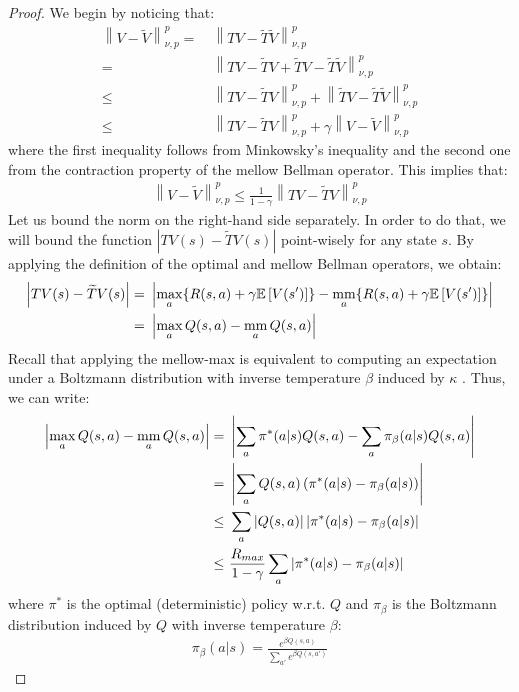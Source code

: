 \documentclass{article}
\newcommand{\mm}{\operatornamewithlimits{mm}}
\newcommand{\wt}[1]{\widetilde{#1}}
\newcommand{\norm}[1]{\left\lVert #1 \right\rVert}
\newcommand{\abs}[1]{\left\lvert #1 \right\rvert}
\begin{document}
\thmmv*
\begin{proof}
We begin by noticing that:
\begin{align*}
\norm{V-\wt{V}}_{\nu,p}^p =\ & \norm{TV - \wt{T}\wt{V}}_{\nu,p}^p \\ =\ &
\norm{TV - \wt{T}V + \wt{T}V - \wt{T}\wt{V}}_{\nu,p}^p \\ \leq\ &
\norm{TV - \wt{T}V}_{\nu,p}^p + \norm{\wt{T}V - \wt{T}\wt{V}}_{\nu,p}^p \\ \leq\ &
\norm{TV - \wt{T}V}_{\nu,p}^p + \gamma\norm{V - \wt{V}}_{\nu,p}^p
\end{align*}
where the first inequality follows from Minkowsky's inequality and the second one from the contraction property of the mellow Bellman operator. This implies that:
\begin{align} \label{eq:mm1}
\norm{V-\wt{V}}_{\nu,p}^p \leq \frac{1}{1-\gamma}\norm{TV - \wt{T}V}_{\nu,p}^p
\end{align}
Let us bound the norm on the right-hand side separately. In order to do that, we will bound the function $\abs{TV(s) - \wt{T}V(s)}$ point-wisely for any state $s$. By applying the definition of the optimal and mellow Bellman operators, we obtain:
\begin{align*}
\abs{TV(s) - \wt{T}V(s)} =\ & \abs{\max_{a}\lbrace R(s,a) + \gamma\mathbb{E}\left[V(s')\right] \rbrace - \mm_{a}\lbrace R(s,a) + \gamma\mathbb{E}\left[V(s')\right] \rbrace}\\ =\ & \abs{\max_a Q(s,a) - \mm_a Q(s,a)}
\end{align*}
Recall that applying the mellow-max is equivalent to computing an expectation under a Boltzmann distribution with inverse temperature $\beta$ induced by $\kappa$ \cite{}. Thus, we can write:
\begin{align} \label{eq:mm2}
\abs{\max_a Q(s,a) - \mm_a Q(s,a)} =\ & \abs{\sum_a \pi^*(a|s)Q(s,a) - \sum_a \pi_{\beta}(a|s)Q(s,a)}\notag\\ =\ & \abs{\sum_a Q(s,a) \left( \pi^*(a|s) - \pi_{\beta}(a|s)  \right)}\notag\\ \leq\ & \sum_a \abs{Q(s,a)} \abs{\pi^*(a|s) - \pi_{\beta}(a|s)}\notag\\ \leq\ & \frac{R_{max}}{1-\gamma}\sum_a\abs{\pi^*(a|s) - \pi_{\beta}(a|s)}
\end{align}
where $\pi^*$ is the optimal (deterministic) policy w.r.t. $Q$ and $\pi_{\beta}$ is the Boltzmann distribution induced by $Q$ with inverse temperature $\beta$:
\begin{align*}
\pi_{\beta}(a|s) = \frac{e^{\beta Q(s,a)}}{\sum_{a'}e^{\beta Q(s,a')}}

\end{align*}
\end{proof}
\end{document}
